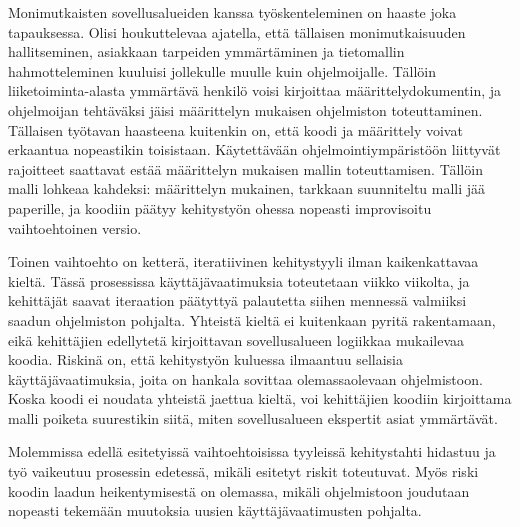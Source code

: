 Monimutkaisten sovellusalueiden kanssa työskenteleminen on haaste joka
tapauksessa. Olisi houkuttelevaa ajatella, että tällaisen
monimutkaisuuden hallitseminen, asiakkaan tarpeiden ymmärtäminen ja
tietomallin hahmotteleminen kuuluisi jollekulle muulle kuin
ohjelmoijalle. Tällöin liiketoiminta-alasta ymmärtävä henkilö voisi
kirjoittaa määrittelydokumentin, ja ohjelmoijan tehtäväksi jäisi
määrittelyn mukaisen ohjelmiston toteuttaminen. Tällaisen työtavan
haasteena kuitenkin on, että koodi ja määrittely voivat erkaantua
nopeastikin toisistaan. Käytettävään ohjelmointiympäristöön liittyvät
rajoitteet saattavat estää määrittelyn mukaisen mallin toteuttamisen.
Tällöin malli lohkeaa kahdeksi: määrittelyn mukainen, tarkkaan
suunniteltu malli jää paperille, ja koodiin päätyy kehitystyön ohessa
nopeasti improvisoitu vaihtoehtoinen versio.

Toinen vaihtoehto on ketterä, iteratiivinen kehitystyyli ilman
kaikenkattavaa kieltä. Tässä prosessissa käyttäjävaatimuksia toteutetaan
viikko viikolta, ja kehittäjät saavat iteraation päätyttyä palautetta
siihen mennessä valmiiksi saadun ohjelmiston pohjalta. Yhteistä kieltä
ei kuitenkaan pyritä rakentamaan, eikä kehittäjien edellytetä
kirjoittavan sovellusalueen logiikkaa mukailevaa koodia. Riskinä on,
että kehitystyön kuluessa ilmaantuu sellaisia käyttäjävaatimuksia, joita
on hankala sovittaa olemassaolevaan ohjelmistoon. Koska koodi ei noudata
yhteistä jaettua kieltä, voi kehittäjien koodiin kirjoittama malli
poiketa suurestikin siitä, miten sovellusalueen ekspertit asiat
ymmärtävät.

Molemmissa edellä esitetyissä vaihtoehtoisissa tyyleissä kehitystahti
hidastuu ja työ vaikeutuu prosessin edetessä, mikäli esitetyt riskit
toteutuvat. Myös riski koodin laadun heikentymisestä on olemassa, mikäli
ohjelmistoon joudutaan nopeasti tekemään muutoksia uusien
käyttäjävaatimusten pohjalta.
